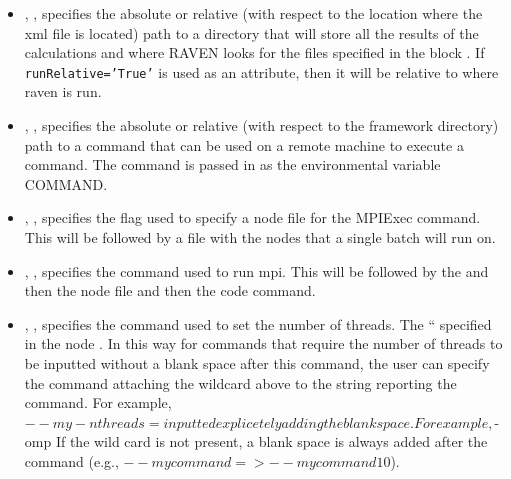 \begin{itemize}
\item {}, ,
  specifies the absolute or relative (with respect to the location
  where the xml file is located) path to a directory that will store
  all the results of the calculations and where RAVEN looks for the
  files specified in the block .  If
  \texttt{runRelative='True'} is used as an attribute, then it will be
  relative to where raven is run.
%


\item {}, ,
  specifies the absolute or relative (with respect to the framework
  directory) path to a command that can be used on a remote machine to
  execute a command.  The command is passed in as the environmental
  variable COMMAND.
%


\item {}, ,
  specifies the flag used to specify a node file for the MPIExec command.  This will be followed by a file with the nodes that a single batch will run on.

\item {}, , specifies the command used to run mpi.  This will be followed by the  and then the node file and then the code command.

\item {}, , specifies the command used to set the
    number of threads. The ``%
    specified in the node . In this way for commands
    that require the number of threads to be inputted without a blank space after this command,
    the user can specify the command attaching the wildcard above to the string reporting the command.
    For example, $--my-nthreads=%
    inputted explicetely adding the blank space. For example, $-omp %
    If the wild card is not present, a blank space is always added after the command
    (e.g., $--mycommand => --mycommand 10$).


\end{itemize}
